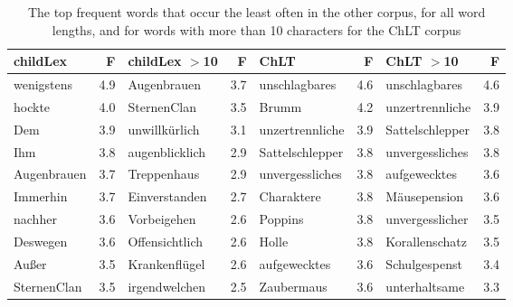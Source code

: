 \documentclass[doc, a4paper, anonymous]{apa7}
\begin{document}
\begin{table}[!htbp]
\caption{The top frequent words that occur the least often in the other corpus, for all word lengths, and for words with more than 10 characters for the ChLT corpus}
\centering
\begin{tabular}{lrlrlrlr}
  \hline
childLex & F & childLex $>$10 & F & ChLT & F & ChLT $>$10 & F \\ 
  \hline
wenigstens & 4.9 & Augenbrauen & 3.7 & unschlagbares & 4.6 & unschlagbares & 4.6 \\ 
  hockte & 4.0 & SternenClan & 3.5 & Brumm & 4.2 & unzertrennliche & 3.9 \\ 
  Dem & 3.9 & unwillkürlich & 3.1 & unzertrennliche & 3.9 & Sattelschlepper & 3.8 \\ 
  Ihm & 3.8 & augenblicklich & 2.9 & Sattelschlepper & 3.8 & unvergessliches & 3.8 \\ 
  Augenbrauen & 3.7 & Treppenhaus & 2.9 & unvergessliches & 3.8 & aufgewecktes & 3.6 \\ 
  Immerhin & 3.7 & Einverstanden & 2.7 & Charaktere & 3.8 & Mäusepension & 3.6 \\ 
  nachher & 3.6 & Vorbeigehen & 2.6 & Poppins & 3.8 & unvergesslicher & 3.5 \\ 
  Deswegen & 3.6 & Offensichtlich & 2.6 & Holle & 3.8 & Korallenschatz & 3.5 \\ 
  Außer & 3.5 & Krankenflügel & 2.6 & aufgewecktes & 3.6 & Schulgespenst & 3.4 \\ 
  SternenClan & 3.5 & irgendwelchen & 2.5 & Zaubermaus & 3.6 & unterhaltsame & 3.3 \\ 
   \hline
\end{tabular}
\label{words-chlt-low}
\end{table}
\end{document}
